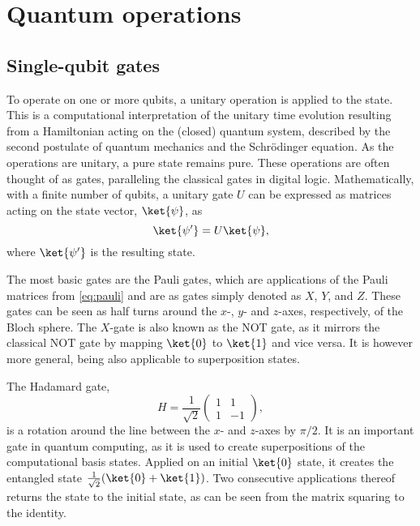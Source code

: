 \section{Quantum operations}
\label{sec:quantum_operations}
\subsection{Single-qubit gates}
To operate on one or more qubits, a unitary operation is applied to the state.
This is a computational interpretation of the unitary time evolution resulting from a Hamiltonian acting on the (closed) quantum system, described by the second postulate of quantum mechanics and the Schrödinger equation.
As the operations are unitary, a pure state remains pure.
These operations are often thought of as gates, paralleling the classical gates in digital logic.
Mathematically, with a finite number of qubits, a unitary gate $U$ can be expressed as matrices acting on the state vector, $\ket{\psi}$, as
\begin{equation}
    \ket{\psi'} = U\ket{\psi},
\end{equation}
where $\ket{\psi'}$ is the resulting state.

The most basic gates are the Pauli gates, which are applications of the Pauli matrices from \cref{eq:pauli} and are as gates simply denoted as $X$, $Y$, and $Z$.
These gates can be seen as half turns around the $x$-, $y$- and $z$-axes, respectively, of the Bloch sphere.
The $X$-gate is also known as the NOT gate, as it mirrors the classical NOT gate by mapping $\ket{0}$ to $\ket{1}$ and vice versa.
It is however more general, being also applicable to superposition states.

The Hadamard gate,
\begin{equation}
    H = \frac{1}{\sqrt{2}} \begin{pmatrix} 1 & 1 \\ 1 & -1 \end{pmatrix},
\end{equation}
is a rotation around the line between the $x$- and $z$-axes by $\pi/2$.
It is an important gate in quantum computing, as it is used to create superpositions of the computational basis states.
Applied on an initial $\ket{0}$ state, it creates the entangled state $\frac{1}{\sqrt{2}}(\ket{0} + \ket{1})$.
Two consecutive applications thereof returns the state to the initial state, as can be seen from the matrix squaring to the identity.

